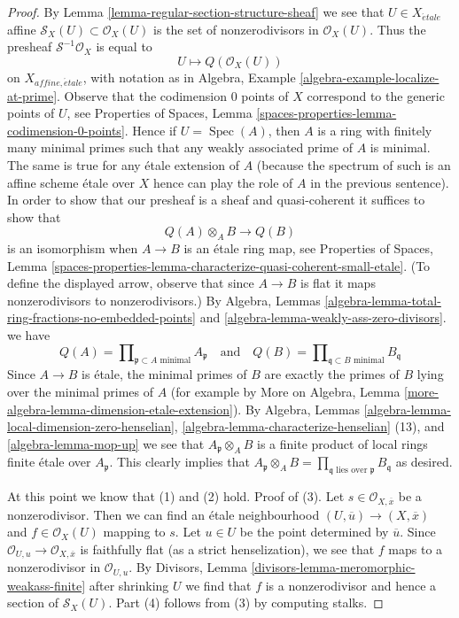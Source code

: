 \documentclass{stacks-project}
\theoremstyle{plain}
\theoremstyle{definition}
\theoremstyle{remark}
\numberwithin{equation}{subsection}
\def\Spec{\mathop{\mathrm{Spec}}}
\def\etale{{\acute{e}tale}}
\begin{document}
\begin{proof}
By Lemma \ref{lemma-regular-section-structure-sheaf}
we see that $U \in X_\etale$ affine
$\mathcal{S}_X(U) \subset \mathcal{O}_X(U)$
is the set of nonzerodivisors in $\mathcal{O}_X(U)$.
Thus the presheaf $\mathcal{S}^{-1}\mathcal{O}_X$ is equal to
$$
U \longmapsto Q(\mathcal{O}_X(U))
$$
on $X_{affine, \etale}$, with notation as in
Algebra, Example \ref{algebra-example-localize-at-prime}.
Observe that the codimension $0$ points of $X$ correspond
to the generic points of $U$, see
Properties of Spaces, Lemma \ref{spaces-properties-lemma-codimension-0-points}.
Hence if $U = \Spec(A)$, then $A$ is a ring with finitely many minimal primes
such that any weakly associated prime of $A$ is minimal.
The same is true for any \'etale extension of $A$ (because the
spectrum of such is an affine scheme \'etale over $X$ hence can
play the role of $A$ in the previous sentence).
In order to show that our presheaf is a sheaf and quasi-coherent
it suffices to show that
$$
Q(A) \otimes_A B \longrightarrow Q(B)
$$
is an isomorphism when $A \to B$ is an \'etale ring map, see
Properties of Spaces, Lemma
\ref{spaces-properties-lemma-characterize-quasi-coherent-small-etale}.
(To define the displayed arrow, observe that since $A \to B$
is flat it maps nonzerodivisors to nonzerodivisors.)
By Algebra, Lemmas
\ref{algebra-lemma-total-ring-fractions-no-embedded-points} and
\ref{algebra-lemma-weakly-ass-zero-divisors}.
we have
$$
Q(A) = \prod\nolimits_{\mathfrak p \subset A\text{ minimal}} A_\mathfrak p
\quad\text{and}\quad
Q(B) = \prod\nolimits_{\mathfrak q \subset B\text{ minimal}} B_\mathfrak q
$$
Since $A \to B$ is \'etale, the minimal primes of $B$ are exactly the
primes of $B$ lying over the minimal primes
of $A$ (for example by More on Algebra, Lemma
\ref{more-algebra-lemma-dimension-etale-extension}).
By Algebra, Lemmas \ref{algebra-lemma-local-dimension-zero-henselian},
\ref{algebra-lemma-characterize-henselian} (13), and
\ref{algebra-lemma-mop-up} we see that $A_\mathfrak p \otimes_A B$
is a finite product of local rings finite \'etale over $A_\mathfrak p$.
This clearly implies that $A_\mathfrak p \otimes_A B =
\prod_{\mathfrak q\text{ lies over }\mathfrak p} B_\mathfrak q$
as desired.

\medskip\noindent
At this point we know that (1) and (2) hold.
Proof of (3). Let $s \in \mathcal{O}_{X, \overline{x}}$
be a nonzerodivisor. Then we can find an \'etale neighbourhood
$(U, \overline{u}) \to (X, \overline{x})$
and $f \in \mathcal{O}_X(U)$ mapping to $s$.
Let $u \in U$ be the point determined by $\overline{u}$.
Since $\mathcal{O}_{U, u} \to \mathcal{O}_{X, \overline{x}}$
is faithfully flat (as a strict henselization), we see that
$f$ maps to a nonzerodivisor in $\mathcal{O}_{U, u}$.
By Divisors, Lemma \ref{divisors-lemma-meromorphic-weakass-finite}
after shrinking $U$ we find that $f$ is a nonzerodivisor
and hence a section of $\mathcal{S}_X(U)$.
Part (4) follows from (3) by computing stalks.
\end{proof}
\end{document}
